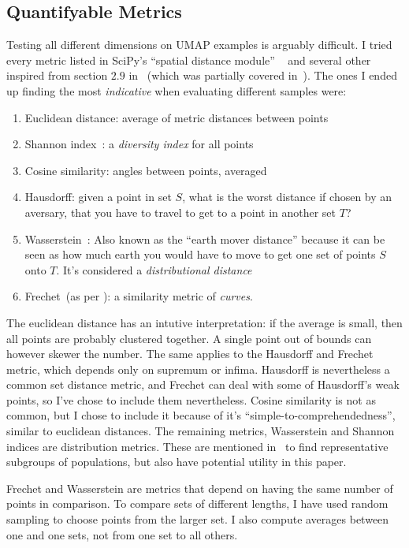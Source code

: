 \documentclass[10pt,twocolumn,letterpaper]{article}
\begin{document}
\subsection{Quantifyable Metrics}\label{sec:quantifiable}
Testing all different dimensions on \gls{UMAP} examples is arguably difficult. I tried every metric listed in SciPy's ``spatial distance module'' ~\cite{scipy} and several other inspired from section $2.9$ in~\cite{datarepresentativity} (which was partially covered in~). The ones I ended up finding the most \textit{indicative} when evaluating different samples were:
\begin{enumerate}
  \item Euclidean distance: average of metric distances between points
  \item Shannon index~\cite{shannon1948mathematical}: a \textit{diversity index} for all points 
  \item Cosine similarity: angles between points, averaged
  \item Hausdorff: given a point in set $S$, what is the worst distance if chosen by an aversary, that you have to travel to get to a point in another set $T$?
  \item Wasserstein~\cite{vaserstein1969markov}: Also known as the ``earth mover distance'' because it can be seen as how much earth you would have to move to get one set of points $S$ onto $T$. It's considered a \textit{distributional distance}
  \item Frechet~(as per \cite{eiter1994computing}): a similarity metric of \textit{curves}.
\end{enumerate}

The euclidean distance has an intutive interpretation: if the average is small, then all points are probably clustered together. A single point out of bounds can however skewer the number. The same applies to the Hausdorff and Frechet metric, which depends only on supremum or infima. Hausdorff is nevertheless a common set distance metric, and Frechet can deal with some of Hausdorff's weak points, so I've chose to include them nevertheless. Cosine similarity is not as common, but I chose to include it because of it's ``simple-to-comprehendedness'', similar to euclidean distances. The remaining metrics, Wasserstein and Shannon indices are distribution metrics. These are mentioned in~\cite{datarepresentativity} to find representative subgroups of populations, but also have potential utility in this paper. 

Frechet and Wasserstein are metrics that depend on having the same number of points in comparison. To compare sets of different lengths, I have used random sampling to choose points from the larger set. I also compute averages between one and one sets, not from one set to all others.
\end{document}
